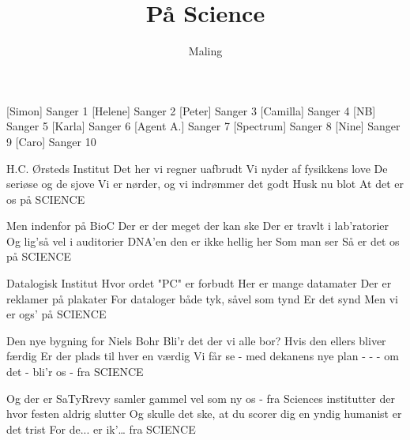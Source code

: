 \documentclass[a4paper,11pt]{article}
\title{På Science}
\author{Maling}
\begin{document}
\maketitle

\begin{roles}
[Simon] Sanger 1
[Helene] Sanger 2
[Peter] Sanger 3
[Camilla] Sanger 4
[NB] Sanger 5
[Karla] Sanger 6
[Agent A.] Sanger 7
[Spectrum] Sanger 8
[Nine] Sanger 9
[Caro] Sanger 10
\end{roles}

\begin{song}

 H.C. Ørsteds Institut
Det her vi regner uafbrudt
Vi nyder af fysikkens love
De seriøse og de sjove
Vi er nørder, og vi indrømmer det godt
Husk nu blot
At det er os på SCIENCE

 Men indenfor på BioC
Der er der meget der kan ske
Der er travlt i lab’ratorier
Og lig’så vel i auditorier
DNA’en den er ikke hellig her
Som man ser
Så er det os på SCIENCE

 Datalogisk Institut
Hvor ordet "PC" er forbudt
Her er mange datamater
Der er reklamer på plakater
For dataloger både tyk, såvel som tynd
Er det synd
Men vi er ogs' på SCIENCE

 Den nye bygning for Niels Bohr
Bli'r det der vi alle bor?
Hvis den ellers bliver færdig
Er der plads til hver en værdig
Vi får se - med dekanens nye plan
- - -
om det - bli'r os - fra SCIENCE

 Og der er SaTyRrevy
samler gammel vel som ny
os - fra Sciences institutter
der hvor festen aldrig slutter
Og skulle det ske, at du scorer dig en yndig humanist
er det trist
For de... er ik'… fra SCIENCE

\end{song}
\end{document}

